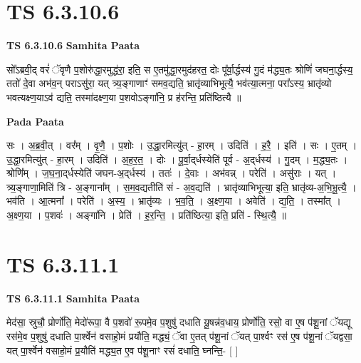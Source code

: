 \documentclass[17pt]{extarticle}
\begin{document}
\section*{ TS 6.3.10.6 }

\textbf{TS 6.3.10.6 } \newline
\textbf{Samhita Paata} \newline

सो᳚ऽब्रवी॒द् वरं॑ ॅवृणै प॒शोरु॑द्धा॒रमुद्ध॑रा॒ इति॒ स ए॒तमु॑द्धा॒रमुद॑हरत॒ दोः पू᳚र्वा॒र्द्धस्य॑ गु॒दं म॑द्ध्य॒तः श्रोणिं॑ जघना॒र्द्धस्य॒ ततो॑ दे॒वा अभ॑व॒न् पराऽसु॑रा॒ यत् त्र्य॒ङ्गाणाꣳ॑ समव॒द्यति॒ भ्रातृ॑व्याभिभूत्यै॒ भव॑त्या॒त्मना॒ परा᳚ऽस्य॒ भ्रातृ॑व्यो भवत्यक्ष्ण॒याऽव॑ द्यति॒ तस्मा॑दक्ष्ण॒या प॒शवोऽङ्गा॑नि॒ प्र ह॑रन्ति॒ प्रति॑ष्ठित्यै ॥ \newline

\textbf{Pada Paata} \newline

सः । अ॒ब्र॒वी॒त् । वर᳚म् । वृ॒णै॒ । प॒शोः । उ॒द्धा॒रमित्यु॑त् - हा॒रम् । उदिति॑ । ह॒रै॒ । इति॑ । सः । ए॒तम् । उ॒द्धा॒रमित्यु॑त् - हा॒रम् । उदिति॑ । अ॒ह॒र॒त॒ । दोः । पू॒र्वा॒द्‌र्धस्येति॑ पूर्व - अ॒द्‌र्धस्य॑ । गु॒दम् । म॒द्ध्य॒तः । श्रोणि᳚म् । ज॒घ॒ना॒द्‌र्धस्येति॑ जघन-अ॒द्‌र्धस्य॑ । ततः॑ । दे॒वाः । अभ॑वन्न् । परेति॑ । असु॑राः । यत् । त्र्य॒ङ्गाणा॒मिति॑ त्रि - अ॒ङ्गाना᳚म् । स॒म॒व॒द्यतीति॑ सं - अ॒व॒द्यति॑ । भ्रातृ॑व्याभिभूत्या॒ इति॒ भ्रातृ॑व्य-अ॒भि॒भू॒त्यै॒ । भव॑ति । आ॒त्मना᳚ । परेति॑ । अ॒स्य॒ । भ्रातृ॑व्यः । भ॒व॒ति॒ । अ॒क्ष्ण॒या । अवेति॑ । द्य॒ति॒ । तस्मा᳚त् । अ॒क्ष्ण॒या । प॒शवः॑ । अङ्गा॑नि । प्रेति॑ । ह॒र॒न्ति॒ । प्रति॑ष्ठित्या॒ इति॒ प्रति॑ - स्थि॒त्यै॒ ॥  \newline




\section*{ TS 6.3.11.1 }

\textbf{TS 6.3.11.1 } \newline
\textbf{Samhita Paata} \newline

मेद॑सा॒ स्रुचौ॒ प्रोर्णो॑ति॒ मेदो॑रूपा॒ वै प॒शवो॑ रू॒पमे॒व प॒शुषु॑ दधाति यू॒षन्न॑व॒धाय॒ प्रोर्णो॑ति॒ रसो॒ वा ए॒ष प॑शू॒नां ॅयद्यू रस॑मे॒व प॒शुषु॑ दधाति पा॒र्श्वेन॑ वसाहो॒मं प्रयौ॑ति॒ मद्ध्यं॒ ॅवा ए॒तत् प॑शू॒नां ॅयत् पा॒र्श्वꣳ रस॑ ए॒ष प॑शू॒नां ॅयद्वसा॒ यत् पा॒र्श्वेन॑ वसाहो॒मं प्र॒यौति॑ मद्ध्य॒त ए॒व प॑शू॒नाꣳ रसं॑ दधाति॒ घ्नन्ति॒- [  ] \newline
\end{document}
